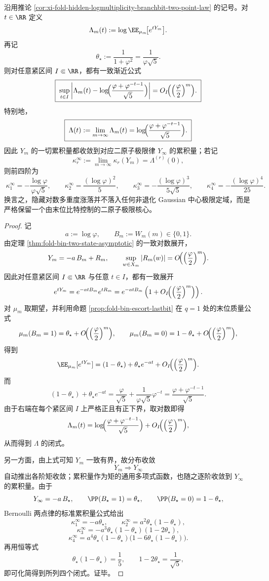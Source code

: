 \begin{theorem}\label{thm:xi-fold-hidden-logmultiplicity-laplace-cumulant-closed}
沿用推论 \ref{cor:xi-fold-hidden-logmultiplicity-branchbit-two-point-law} 的记号。对 \(t\in\RR\) 定义
\[
\Lambda_m(t):=\log \EE_{\mu_m}\!\bigl[e^{tY_m}\bigr].
\]
再记
\[
\theta_\star:=\frac{1}{1+\varphi^2}=\frac{1}{\varphi\sqrt5}.
\]
则对任意紧区间 \(I\Subset\RR\)，都有一致渐近公式
\[
\boxed{\;
\sup_{t\in I}
\left|
\Lambda_m(t)
-\log\!\Bigl(\frac{\varphi+\varphi^{-t-1}}{\sqrt5}\Bigr)
\right|
=
O_I\!\Bigl(\Bigl(\frac{\varphi}{2}\Bigr)^m\Bigr).\;}
\]
特别地，
\[
\boxed{\;
\Lambda(t):=\lim_{m\to\infty}\Lambda_m(t)
=
\log\!\Bigl(\frac{\varphi+\varphi^{-t-1}}{\sqrt5}\Bigr).\;}
\]
因此 \(Y_m\) 的一切累积量都收敛到对应二原子极限律 \(Y_\infty\) 的累积量；若记
\[
\kappa_r^\infty:=\lim_{m\to\infty}\kappa_r(Y_m)=\Lambda^{(r)}(0),
\]
则前四阶为
\[
\boxed{\;
\kappa_1^\infty=-\frac{\log\varphi}{\varphi\sqrt5},\qquad
\kappa_2^\infty=\frac{(\log\varphi)^2}{5},\qquad
\kappa_3^\infty=-\frac{(\log\varphi)^3}{5\sqrt5},\qquad
\kappa_4^\infty=-\frac{(\log\varphi)^4}{25}.\;}
\]
换言之，隐藏对数多重度涨落并不落入任何非退化 Gaussian 中心极限定域，而是严格保留一个由末位比特控制的二原子极限核心。
\end{theorem}
\begin{proof}
记
\[
a:=\log\varphi,
\qquad
B_m:=W_m(m)\in\{0,1\}.
\]
由定理 \ref{thm:fold-bin-two-state-asymptotic} 的一致对数展开，
\[
Y_m=-a\,B_m+R_m,
\qquad
\sup_{w\in X_m}|R_m(w)|
=
O\!\Bigl(\Bigl(\frac{\varphi}{2}\Bigr)^m\Bigr).
\]
因此对任意紧区间 \(I\Subset\RR\) 与任意 \(t\in I\)，都有一致展开
\[
e^{tY_m}
=
e^{-atB_m}e^{tR_m}
=
e^{-atB_m}
\left(
1+O_I\!\Bigl(\Bigl(\frac{\varphi}{2}\Bigr)^m\Bigr)
\right).
\]
对 \(\mu_m\) 取期望，并利用命题 \ref{prop:fold-bin-escort-lastbit} 在 \(q=1\) 处的末位质量公式
\[
\mu_m(B_m=1)=\theta_\star+O\!\Bigl(\Bigl(\frac{\varphi}{2}\Bigr)^m\Bigr),
\qquad
\mu_m(B_m=0)=1-\theta_\star+O\!\Bigl(\Bigl(\frac{\varphi}{2}\Bigr)^m\Bigr),
\]
得到
\[
\EE_{\mu_m}[e^{tY_m}]
=
(1-\theta_\star)+\theta_\star e^{-at}
+O_I\!\Bigl(\Bigl(\frac{\varphi}{2}\Bigr)^m\Bigr).
\]
而
\[
(1-\theta_\star)+\theta_\star e^{-at}
=
\frac{\varphi}{\sqrt5}+\frac{1}{\varphi\sqrt5}\varphi^{-t}
=
\frac{\varphi+\varphi^{-t-1}}{\sqrt5}.
\]
由于右端在每个紧区间 \(I\) 上严格正且有正下界，取对数即得
\[
\Lambda_m(t)
=
\log\!\Bigl(\frac{\varphi+\varphi^{-t-1}}{\sqrt5}\Bigr)
+O_I\!\Bigl(\Bigl(\frac{\varphi}{2}\Bigr)^m\Bigr),
\]
从而得到 \(\Lambda\) 的闭式。

另一方面，由上式可知 \(Y_m\) 一致有界，故分布收敛
\[
Y_m\Rightarrow Y_\infty
\]
自动推出各阶矩收敛；累积量作为矩的通用多项式函数，也随之逐阶收敛到 \(Y_\infty\) 的累积量。由于
\[
Y_\infty=-a\,B_\star,
\qquad
\PP(B_\star=1)=\theta_\star,
\qquad
\PP(B_\star=0)=1-\theta_\star,
\]
Bernoulli 两点律的标准累积量公式给出
\[
\kappa_1^\infty=-a\theta_\star,\qquad
\kappa_2^\infty=a^2\theta_\star(1-\theta_\star),
\]
\[
\kappa_3^\infty=-a^3\theta_\star(1-\theta_\star)(1-2\theta_\star),
\]
\[
\kappa_4^\infty=a^4\theta_\star(1-\theta_\star)\bigl(1-6\theta_\star(1-\theta_\star)\bigr).
\]
再用恒等式
\[
\theta_\star(1-\theta_\star)=\frac15,
\qquad
1-2\theta_\star=\frac{1}{\sqrt5},
\]
即可化简得到所列四个闭式。证毕。
\end{proof}

\endinput
